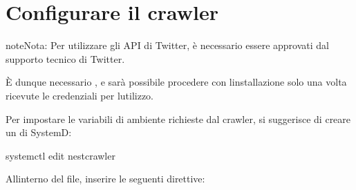 \documentclass[letterpaper,10pt,italian]{sphinxmanual}
\begin{document}
\section{Configurare il crawler}
\label{\detokenize{guide/installation:configurare-il-crawler}}
\begin{sphinxadmonition}{note}{Nota:}
\sphinxAtStartPar
Per utilizzare gli API di Twitter, è necessario essere approvati dal supporto tecnico di Twitter.

\sphinxAtStartPar
È dunque necessario , e sarà possibile
procedere con l\textquotesingle{}installazione solo una volta ricevute le credenziali per l\textquotesingle{}utilizzo.
\end{sphinxadmonition}

\sphinxAtStartPar
Per impostare le variabili di ambiente richieste dal crawler, si suggerisce di creare un  di SystemD:

\begin{sphinxVerbatim}[commandchars=\\\{\}]
systemctl edit nest\PYGZhy{}crawler
\end{sphinxVerbatim}

\sphinxAtStartPar
All\textquotesingle{}interno del file, inserire le seguenti direttive:
\end{document}
